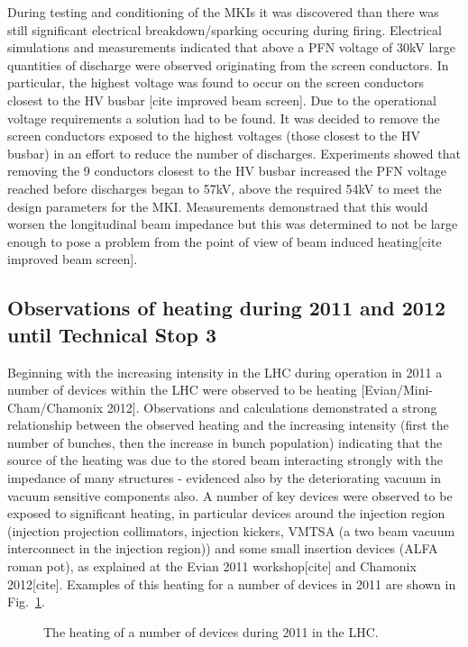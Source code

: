 During testing and conditioning of the MKIs it was discovered than there was still significant electrical breakdown/sparking occuring during firing. Electrical simulations and measurements indicated that above a PFN voltage of 30kV large quantities of discharge were observed originating from the screen conductors. In particular, the highest voltage was found to occur on the screen conductors closest to the HV busbar [cite improved beam screen]. Due to the operational voltage requirements a solution had to be found. It was decided to remove the screen conductors exposed to the highest voltages (those closest to the HV busbar) in an effort to reduce the number of discharges. Experiments showed that removing the 9 conductors closest to the HV busbar increased the PFN voltage reached before discharges began to 57kV, above the required 54kV to meet the design parameters for the MKI. Measurements demonstraed that this would worsen the longitudinal beam impedance but this was determined to not be large enough to pose a problem from the point of view of beam induced heating[cite improved beam screen].

\subsection{Observations of heating during 2011 and 2012 until Technical Stop 3}

Beginning with the increasing intensity in the LHC during operation in 2011 a number of devices within the LHC were observed to be heating [Evian/Mini-Cham/Chamonix 2012]. Observations and calculations demonstrated a strong relationship between the observed heating and the increasing intensity (first the number of bunches, then the increase in bunch population) indicating that the source of the heating was due to the stored beam interacting strongly with the impedance of many structures - evidenced also by the deteriorating vacuum in vacuum sensitive components also. A number of key devices were observed to be exposed to significant heating, in particular devices around the injection region (injection projection collimators, injection kickers, VMTSA (a two beam vacuum interconnect in the injection region)) and some small insertion devices (ALFA roman pot), as explained at the Evian 2011 workshop[cite] and Chamonix 2012[cite]. Examples of this heating for a number of devices in 2011 are shown in Fig.~\ref{fig:lhc-heating-2011}.

\begin{figure}
\label{fig:lhc-heating-2011}
\caption{The heating of a number of devices during 2011 in the LHC.}
\end{figure}

